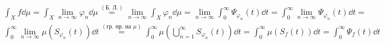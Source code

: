 \documentclass[bulgarian, 12pt]{article}
\begin{document}
\begin{align*}
  & \int_{X} f \dd \mu = \int_{X} \lim_{n \to \infty} \varphi_n \dd \mu \overset{(\text{Б. Л.})}{=} \lim_{n \to \infty} \int_{X} \varphi_n \dd \mu = \lim_{n \to \infty} \int_{0}^{\infty} \Psi_{\varphi_n}(t) \dd t = \int_{0}^{\infty} \lim_{n \to \infty} \Psi_{\varphi_n}(t) \dd t  =\\
  & \int_{0}^{\infty} \lim_{n \to \infty} \mu(S_{\varphi_n}(t)) \dd t \overset{(\text{гр. пр. на $\mu$})}{=} \int_{0}^{\infty} \mu(\bigcup_{n=1}^{\infty} S_{\varphi_n}(t)) \dd t = \int_{0}^{\infty} \mu(S_f(t)) \dd t = \int_{0}^{\infty} \Psi_f(t) \dd t
\end{align*}
\end{document}
